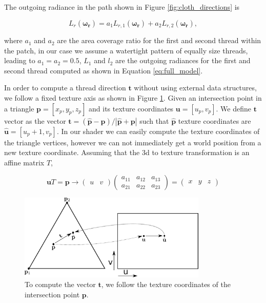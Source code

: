 \documentclass[12pt]{article}
\newcommand{\omegar}{\boldsymbol{\omega_r}}
\newcommand{\tb}{\mathbf{t}}
\begin{document}
The outgoing radiance in the path shown in Figure \ref{fig:cloth_directions} is

\begin{equation}
L_r(\omegar) = a_1 L_{r,1}(\omegar) + a_2 L_{r,2}(\omegar),
\end{equation}

where $a_1$ and $a_2$ are the area coverage ratio for the first and second thread within the patch, in our case we assume a watertight pattern of equally size threads, leading to $a_1 = a_2 = 0.5$, $L_1$ and $l_2$ are the outgoing radiances for the first and second thread computed as shown in Equation \ref{eq:full_model}.

In order to compute a thread direction $\tb$ without using external data structures, we follow a fixed texture axis as shown in Figure \ref{fig:thread_uv_coord}.
Given an intersection point in a triangle $\mathbf{p} = \left[ x_p, y_p,z_p \right]$ and its texture coordinates $\mathbf{u} = \left[ u_p, v_p \right]$.
We define $\tb$ vector as the vector $\tb = (\hat{\mathbf{p}} - \mathbf{p})/ \left|\hat{\mathbf{p}} + \mathbf{p} \right|$ such that $\hat{\mathbf{p}}$ texture coordinates are $\hat{\mathbf{u}} = \left[ u_p + 1, v_p \right]$.
In our shader we can easily compute the texture coordinates of the triangle vertices, however we can not immediately get a world position from a new texture coordinate.
Assuming that the 3d to texture transformation is an affine matrix $T$,

\begin{equation}
\mathbf{u} T = \mathbf{p} \rightarrow
\begin{pmatrix}
u & v
\end{pmatrix}
\begin{pmatrix}
a_{11} & a_{12} & a_{13} \\
a_{21} & a_{22} & a_{23}
\end{pmatrix} =
\begin{pmatrix}
x & y & z
\end{pmatrix}
\label{eq:uv_to_3d}
\end{equation}

\begin{figure}[htbp!]
\centering
\includegraphics[width=0.8\textwidth]{images/thread_3d_coord}
	\caption{To compute the vector $\tb$, we follow the texture coordinates of the intersection point $\mathbf{p}$.}
	\label{fig:thread_uv_coord}
\end{figure}
\end{document}
